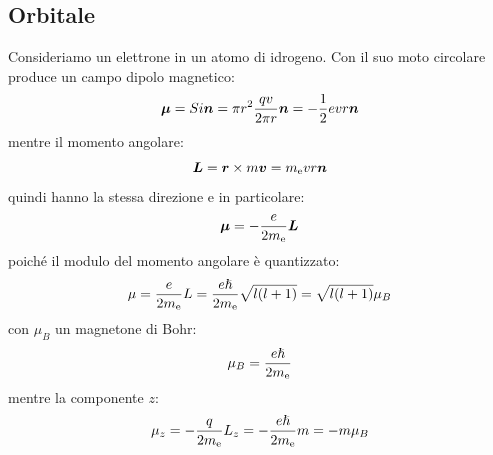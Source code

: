 \subsection{Orbitale}
\label{momento_magnetico_orbitale}
Consideriamo un elettrone in un atomo di idrogeno. Con il suo moto circolare produce un campo dipolo magnetico:
\begin{equation}
	\boldsymbol{\mu}=Si\boldsymbol{n}=\pi r^2 \frac{qv}{2\pi r}\boldsymbol{n}=-\frac{1}{2}evr\boldsymbol{n}
\end{equation}
mentre il momento angolare:
\begin{equation}
	\boldsymbol{L}=\boldsymbol{r}\times m\boldsymbol{v}=m_\mathrm{e}vr\boldsymbol{n}
\end{equation}
quindi hanno la stessa direzione e in particolare:
\begin{equation}
	\boldsymbol{\mu}=-\frac{e}{2m_{\mathrm{e}}}\boldsymbol{L}
\end{equation}
poiché il modulo del momento angolare è quantizzato:
\begin{equation}
	\mu=\frac{e}{2m_{\mathrm{e}}}L=\frac{e\hslash}{2m_{\mathrm{e}}}\sqrt{l(l+1)}=\sqrt{l(l+1)}\mu_B
\end{equation}
con $\mu_B$ un magnetone di Bohr:
\begin{equation}
	\mu_B=\frac{e\hslash}{2m_{\mathrm{e}}}
\end{equation}
mentre la componente $z$:
\begin{equation}
	\mu_z=-\frac{q}{2m_{\mathrm{e}}}L_z=-\frac{e\hslash}{2m_{\mathrm{e}}}m=-m\mu_B
\end{equation}
